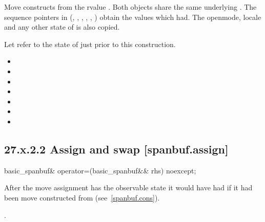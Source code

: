 \documentclass[ebook,11pt,article]{memoir}
\begin{document}
\begin{itemdescr}
\pnum
\effects Move constructs from the rvalue . 
Both  objects share the same underlying .
The sequence pointers in 
(, , ,
, , ) obtain
the values which  had. 
The openmode, locale and any other state of  is
also copied.

\pnum
\postconditions Let  refer to the state of
 just prior to this construction.

\begin{itemize}
\item {}
\item {}
\item {}
\item {}
\item {}
\item {}
\item {}
\end{itemize}
\end{itemdescr}


\subsection{27.x.2.2 Assign and swap [spanbuf.assign]}

\begin{itemdecl}
basic_spanbuf& operator=(basic_spanbuf&& rhs) noexcept;
\end{itemdecl}

\begin{itemdescr}
\pnum
\effects After the move assignment  has the observable state it would
have had if it had been move constructed from  (see~\ref{spanbuf.cons}).

\pnum
\returns {}.
\end{itemdescr}
\end{document}

